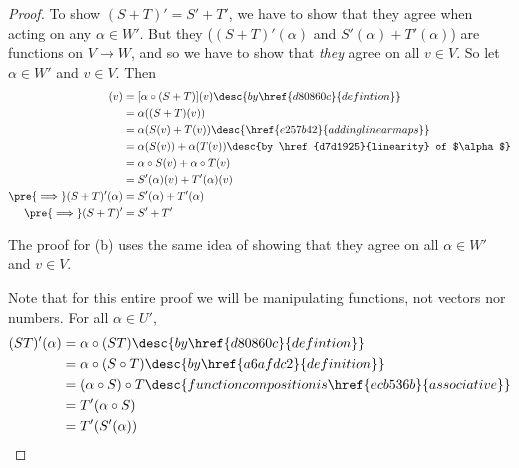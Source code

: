 \begin{proof}
   To show $(S+T)'=S'+T'$, we have to show that they agree when
  acting on any $\alpha\in W'$. But they ($(S+T)'(\alpha)$ and
  $S'(\alpha)+T'(\alpha)$) are functions on $V\to W$, and so we have to show
  that \textit{they} agree on all $v\in V$. So let $\alpha\in W'$ and $v\in V$.
  Then
  \begin{align*}
    [(S+T)'(\alpha)](v)           &=[\alpha\circ(S+T)](v)\desc{by \href{d80860c}{defintion}}                 \\
                                  &=\alpha((S+T)(v))                                                         \\
                                  &=\alpha(S(v)+T(v))\desc{\href{e257b42}{adding linear maps}}               \\
                                  &=\alpha(S(v))+\alpha(T(v))\desc{by \href{d7d1925}{linearity} of $\alpha$} \\
                                  &=\alpha\circ S(v)+\alpha\circ T(v)                                        \\
                                  &=S'(\alpha)(v)+T'(\alpha)(v)                                              \\
    \pre{\implies} (S+T)'(\alpha) &=S'(\alpha)+T'(\alpha)                                                    \\
    \pre{\implies} (S+T)'         &=S'+T'
  \end{align*}

  The proof for (b) uses the same idea of showing that they agree on all
  $\alpha\in W'$ and $v\in V$.

   Note that for this entire proof we will be manipulating
  functions, not vectors nor numbers. For all $\alpha\in U'$,
  \begin{align*}
    (ST)'(\alpha) &=\alpha\circ(ST)\desc{by \href{d80860c}{defintion}}                               \\
                  &=\alpha\circ(S\circ T)\desc{by \href{a6afdc2}{definition}}                        \\
                  &=(\alpha\circ S)\circ T\desc{function composition is \href{ecb536b}{associative}} \\
                  &=T'(\alpha\circ S)                                                                \\
                  &=T'(S'(\alpha))
  \end{align*}
\end{proof}

